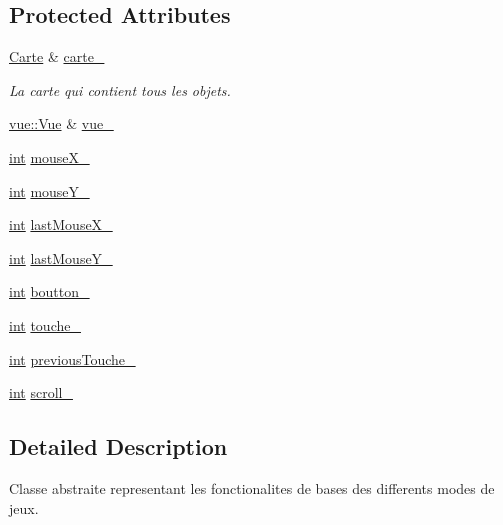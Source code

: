 \subsection*{Protected Attributes}
\begin{DoxyCompactItemize}
\item 
\hyperlink{class_carte}{Carte} \& \hyperlink{group__inf2990_ga5349be037dec2b73adb0fbcca724eb2c}{carte\-\_\-}
\begin{DoxyCompactList}\small\item\em La carte qui contient tous les objets. \end{DoxyCompactList}\item 
\hyperlink{classvue_1_1_vue}{vue\-::\-Vue} \& \hyperlink{group__inf2990_ga82fd620c4ee8342b374bbe848cb78ca2}{vue\-\_\-}
\item 
\hyperlink{wglew_8h_a500a82aecba06f4550f6849b8099ca21}{int} \hyperlink{group__inf2990_gaebf64b4f7fa00bda679ed2815c3030cc}{mouse\-X\-\_\-}
\item 
\hyperlink{wglew_8h_a500a82aecba06f4550f6849b8099ca21}{int} \hyperlink{group__inf2990_ga20f528aad2f2937cf34559ec8091cc22}{mouse\-Y\-\_\-}
\item 
\hyperlink{wglew_8h_a500a82aecba06f4550f6849b8099ca21}{int} \hyperlink{group__inf2990_ga5f106517d59dda12c86741443236f981}{last\-Mouse\-X\-\_\-}
\item 
\hyperlink{wglew_8h_a500a82aecba06f4550f6849b8099ca21}{int} \hyperlink{group__inf2990_ga24d07ce8ed9d2e9176deaaefd8937dd2}{last\-Mouse\-Y\-\_\-}
\item 
\hyperlink{wglew_8h_a500a82aecba06f4550f6849b8099ca21}{int} \hyperlink{group__inf2990_ga6aefbc7c04b8d51ef72b4648f5278ba4}{boutton\-\_\-}
\item 
\hyperlink{wglew_8h_a500a82aecba06f4550f6849b8099ca21}{int} \hyperlink{group__inf2990_ga076e503a05fd9f20e5ecc64e91eabf7f}{touche\-\_\-}
\item 
\hyperlink{wglew_8h_a500a82aecba06f4550f6849b8099ca21}{int} \hyperlink{group__inf2990_ga231796955c445be70dc2273b6de8da36}{previous\-Touche\-\_\-}
\item 
\hyperlink{wglew_8h_a500a82aecba06f4550f6849b8099ca21}{int} \hyperlink{group__inf2990_ga388bde29eb1b80839575085a97dd6063}{scroll\-\_\-}
\end{DoxyCompactItemize}


\subsection{Detailed Description}
Classe abstraite representant les fonctionalites de bases des differents modes de jeux. 

